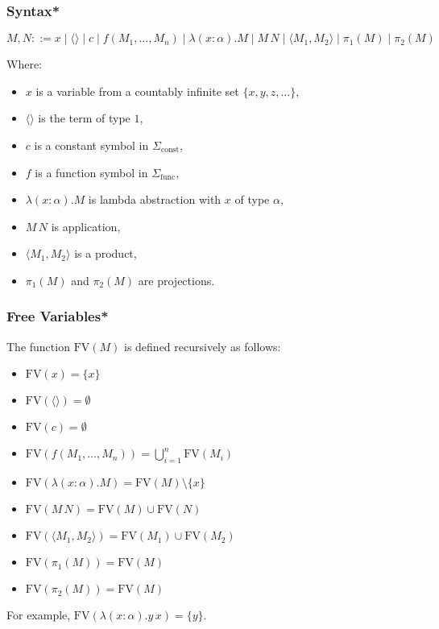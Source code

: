 \documentclass[aspectratio=169]{beamer}
\begin{document}
\begin{frame}
\frametitle{Syntax*}

\[
M, N ::= x \mid \langle \rangle \mid c \mid f(M_1, \ldots, M_n) \mid \lambda (x: \alpha). M \mid M \, N \mid \langle M_1, M_2 \rangle \mid \pi_1(M) \mid \pi_2(M)
\]

Where:
\begin{itemize}
    \item $x$ is a variable from a countably infinite set $\{x, y, z, \ldots \}$,
    \item $\langle \rangle$ is the term of type $1$,
    \item $c$ is a constant symbol in $\Sigma_{\text{const}}$,
    \item $f$ is a function symbol in $\Sigma_{\text{func}}$,
    \item $\lambda (x: \alpha). M$ is lambda abstraction with $x$ of type $\alpha$,
    \item $M\, N$ is application,
    \item $\langle M_1, M_2 \rangle$ is a product,
    \item $\pi_1(M)$ and $\pi_2(M)$ are projections.
\end{itemize}
\end{frame}

\begin{frame}
\frametitle{Free Variables*}
The function $\text{FV}(M)$ is defined recursively as follows:
\begin{itemize}
    \item $\text{FV}(x) = \{x\}$
    \item $\text{FV}(\langle \rangle) = \emptyset$
    \item $\text{FV}(c) = \emptyset$
    \item $\text{FV}(f(M_1, \ldots, M_n)) = \bigcup_{i=1}^{n} \text{FV}(M_i)$
    \pause
    \item $\text{FV}(\lambda (x: \alpha). M) = \text{FV}(M) \setminus \{x\}$
    \pause
    \item $\text{FV}(M \, N) = \text{FV}(M) \cup \text{FV}(N)$
    \item $\text{FV}(\langle M_1, M_2 \rangle) = \text{FV}(M_1) \cup \text{FV}(M_2)$
    \item $\text{FV}(\pi_1(M)) = \text{FV}(M)$
    \item $\text{FV}(\pi_2(M)) = \text{FV}(M)$
\end{itemize}

\pause
For example, $\text{FV}(\lambda (x: \alpha). y \, x) = \{y\}$.

\end{frame}
\end{document}
